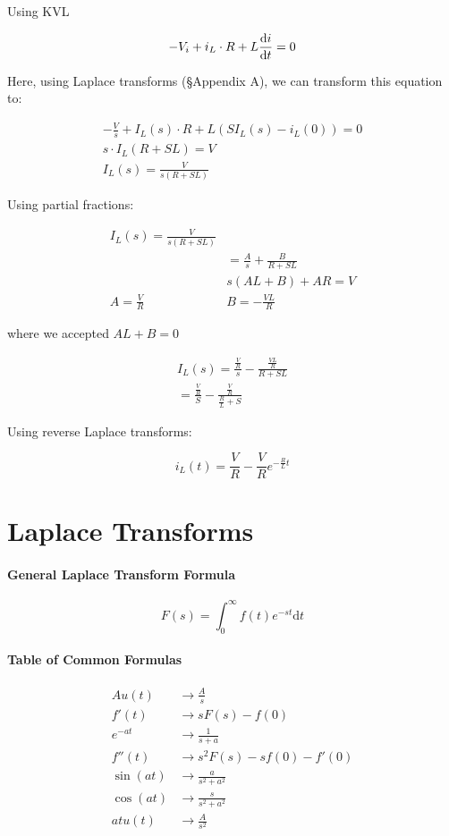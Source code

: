 \documentclass[11pt,a4paper]{book}
\begin{document}
Using KVL

\begin{align*}
-V_i + i_L \cdot R + L \frac{\text{d} i}{\text{d} t} = 0 
\end{align*}

Here, using Laplace transforms (\S Appendix A), we can transform this equation to:

\begin{align*}
- \frac{V}{s} + I_L(s) \cdot R + L\left(SI_L(s) - i_L(0)\right) = 0\\
s \cdot I_L \left(R + SL \right) = V\\
I_L(s) = \frac{V}{s(R + SL)}
\end{align*}

Using partial fractions:

\begin{align*}
I_L(s) = \frac{V}{s(R + SL)}\\
&= \frac{A}{s} + \frac{B}{R + SL}\\
&s \left( AL + B \right) + AR = V\\
A = \frac{V}{R} & B = - \frac{VL}{R}
\end{align*}

where we accepted $AL + B = 0$

\begin{align*}
I_L(s) = \frac{\frac{V}{R}}{s} - \frac{\frac{VL}{R}}{R + SL}\\
= \frac{\frac{V}{R}}{S} - \frac{\frac{V}{R}}{\frac{R}{L} + S}
\end{align*}

Using reverse Laplace transforms:

\begin{equation}
i_L(t) = \frac{V}{R} - \frac{V}{R} e^{-\frac{R}{L}t}
\end{equation}

\appendix

\chapter{Laplace Transforms}

\subsubsection{General Laplace Transform Formula}

\begin{equation}
F(s) = \int_0^\infty f(t)e^{-st}\text{d}t
\end{equation}

\subsubsection{Table of Common Formulas}

\begin{align}
Au(t) &\to \frac{A}{s}\\
f'(t) &\to sF(s) - f(0)\\
e^{-at} &\to \frac{1}{s + a}\\
f''(t) &\to s^2F(s) - sf(0) - f'(0)\\
\sin(a t) &\to \frac{a}{s^2 + a^2}\\
\cos(a t) &\to \frac{s}{s^2 + a^2}\\
atu(t) &\to \frac{A}{s^2} 
\end{align}
\end{document}

